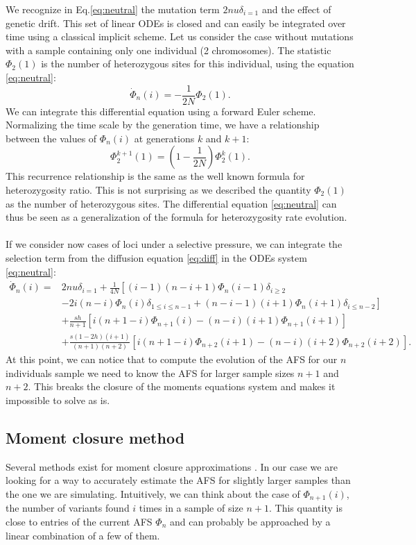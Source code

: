 We recognize in Eq.\eqref{eq:neutral} the mutation term $2nu  \delta_{i=1}$ and the effect of genetic drift. This set of linear ODEs is closed and can easily be integrated over time using a classical implicit scheme.
Let us consider the case without mutations with a sample containing only one individual (2 chromosomes). The statistic $\Phi_2(1)$ is the number of heterozygous sites for this individual, using the equation \eqref{eq:neutral}: 
$$
	\dot \Phi_n(i)= -\frac{1}{2 N} \Phi_2(1).
$$
We can integrate this differential equation using a forward Euler scheme. Normalizing the time scale by the generation time, we have a relationship between the values of $\Phi_n(i)$ at generations $k$ and $k+1$:
$$
	\Phi_2^{k+1}(1) = (1-\frac{1}{2 N})\Phi_2^k(1).
$$
This recurrence relationship is the same as the well known formula for heterozygosity ratio. This is not surprising as we described the quantity $\Phi_2(1)$ as the number of heterozygous sites. The differential equation \eqref{eq:neutral} can thus be seen as a generalization of the formula for heterozygosity rate evolution.

\paragraph{}
If we consider now cases of loci under a selective pressure, we can integrate the selection term from the diffusion equation \eqref{eq:diff} in the ODEs system \eqref{eq:neutral}:
\begin{equation}
\begin{split}
\dot \Phi_n(i)=& 2nu  \delta_{i=1} + \frac{1}{4 N} \left[ (i-1)(n-i+1) \Phi_n(i-1)\delta_{i\geq 2} \right.\\
		      & \left.-2i(n-i)\Phi_n(i)\delta_{1\leq i\leq n-1}  + (n-i-1)(i+1)\Phi_n(i+1)\delta_{i\leq n-2} \right]\\
		      &+ \frac{sh}{n+1}\left[i(n+1-i)\Phi_{n+1}(i)-(n-i)(i+1)\Phi_{n+1}(i+1)\right] \\
		      & +\frac{s(1-2h)(i+1)}{(n+1)(n+2)}\left[i(n+1-i)\Phi_{n+2}(i+1)-(n-i)(i+2)\Phi_{n+2}(i+2)\right].
\end{split}
\label{eq:syst_edo_1pop}
\end{equation}
 At this point, we can notice that to compute the evolution of the AFS for our $n$ individuals sample we need to know the AFS for larger sample sizes $n+1$ and $n+2$. This breaks the closure of the moments equations system and makes it impossible to solve as is.
 
\subsection{Moment closure method}
Several methods exist for moment closure approximations \cite{kuehn2016}. In our case we are looking for a way to accurately estimate the AFS for slightly larger samples than the one we are simulating. Intuitively, we can think about the case of $\Phi_{n+1}(i)$, the number of variants found $i$ times in a sample of size $n+1$. This quantity is close to entries of the current AFS $\Phi_n$ and can probably be approached by a linear combination of a few of them.

